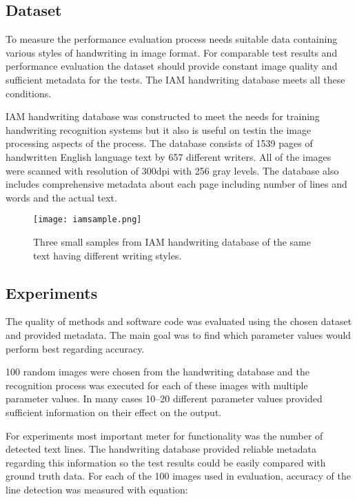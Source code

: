 \documentclass{article}
\begin{document}
  \subsection{Dataset}
    To measure the performance evaluation process needs suitable data containing various styles of handwriting in image format. For comparable test results and performance evaluation the dataset should provide constant image quality and sufficient metadata for the tests. The IAM handwriting database meets all these conditions.

    IAM handwriting database was constructed to meet the needs for training handwriting recognition systems but it also is useful on testin the image processing aspects of the process. The database consists of 1539 pages of handwritten English language text by 657 different writers. All of the images were scanned with resolution of 300dpi with 256 gray levels. The database also includes comprehensive metadata about each page including number of lines and words and the actual text. \cite{IAM}

    \begin{figure}[!ht]
      \centering
      \texttt{[image: iamsample.png]}
      \caption{Three small samples from IAM handwriting database of the same text having different writing styles. \label{fig:iamsample} }
    \end{figure}

  \subsection{Experiments}
    The quality of methods and software code was evaluated using the chosen dataset and provided metadata. The main goal was to find which parameter values would perform best regarding accuracy.

    100 random images were chosen from the handwriting database and the recognition process was executed for each of these images with multiple parameter values. In many cases 10--20 different parameter values provided sufficient information on their effect on the output.

    For experiments most important meter for functionality was the number of detected text lines. The handwriting database provided reliable metadata regarding this information so the test results could be easily compared with ground truth data. For each of the 100 images used in evaluation, accuracy of the line detection was measured with equation:
\end{document}
